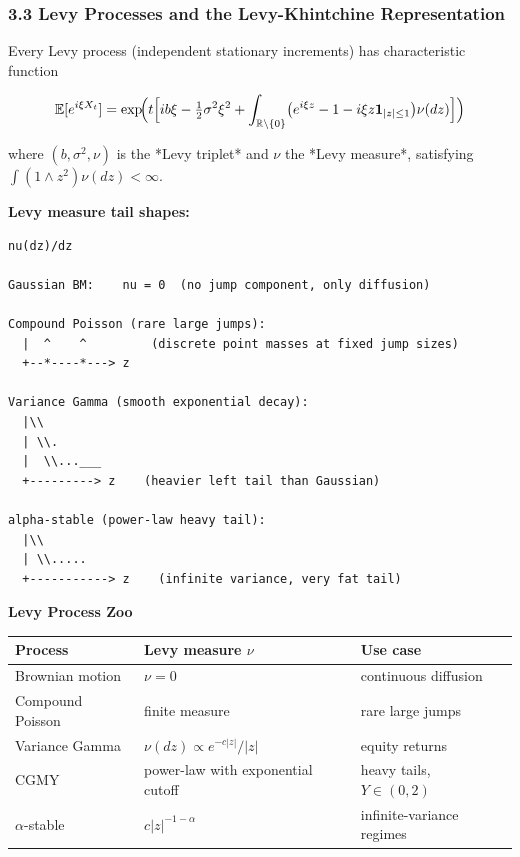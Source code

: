 \documentclass[11pt,a4paper]{article}
\begin{document}
\subsubsection{3.3 Levy Processes and the Levy-Khintchine Representation}\label{levy-processes-and-the-levy-khintchine-representation}

\begin{tcolorbox}[colback=thmbg!60,colframe=optgold,fonttitle=\bfseries\sffamily,title={\textsf{\textbf{Theorem / Key Idea}} — Theorem — Levy-Khintchine},breakable]
Every Levy process (independent stationary increments) has characteristic function

$$\mathbb{E}[e^{i\xi X_t}] = \exp\!\Bigl(t\Bigl[i b\xi - \tfrac{1}{2}\sigma^2\xi^2
+ \int_{\mathbb{R}\setminus\{0\}} \bigl(e^{i\xi z}-1-i\xi z\mathbf{1}_{|z|\le1}\bigr)\nu(dz)\Bigr]\Bigr)$$

where $(b, \sigma^2, \nu)$ is the *Levy triplet* and $\nu$ the *Levy measure*,
satisfying $\int(1\wedge z^2)\nu(dz)<\infty$.
\end{tcolorbox}

\textbf{Levy measure tail shapes:}

\begin{verbatim}
nu(dz)/dz

Gaussian BM:    nu = 0  (no jump component, only diffusion)

Compound Poisson (rare large jumps):
  |  ^    ^         (discrete point masses at fixed jump sizes)
  +--*----*---> z

Variance Gamma (smooth exponential decay):
  |\\
  | \\.
  |  \\...___
  +---------> z    (heavier left tail than Gaussian)

alpha-stable (power-law heavy tail):
  |\\
  | \\.....
  +-----------> z    (infinite variance, very fat tail)
\end{verbatim}

\textbf{Levy Process Zoo}

{\def\LTcaptype{none} %
\begin{longtable}[]{@{}lll@{}}
\toprule\noalign{}
Process & Levy measure \(\nu\) & Use case \\
\midrule\noalign{}
\endhead
\bottomrule\noalign{}
\endlastfoot
Brownian motion & \(\nu=0\) & continuous diffusion \\
Compound Poisson & finite measure & rare large jumps \\
Variance Gamma & \(\nu(dz)\propto e^{-c|z|}/|z|\) & equity returns \\
CGMY & power-law with exponential cutoff & heavy tails, \(Y\in(0,2)\) \\
\(\alpha\)-stable & \(c|z|^{-1-\alpha}\) & infinite-variance regimes \\
\end{longtable}
}
\end{document}
